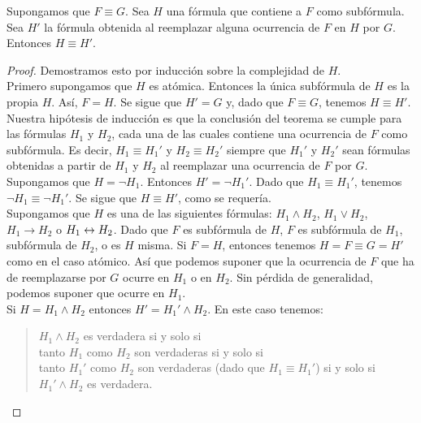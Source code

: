 \documentclass[12pt,a4paper]{book}
\begin{document}
    \begin{teorema}\label{thm:sustitucion}
        Supongamos que $F\equiv G$. Sea $H$ una fórmula que contiene a $F$ como subfórmula. Sea $H'$ la fórmula obtenida al
        reemplazar alguna ocurrencia de $F$ en $H$ por $G$. Entonces $H\equiv H'$.
    \end{teorema}
    \begin{proof}
        Demostramos esto por inducción sobre la complejidad de $H$.\\
        Primero supongamos que $H$ es atómica. Entonces la única subfórmula de $H$ es la propia $H$. Así, $F=H$. Se sigue que
        $H'=G$ y, dado que $F\equiv G$, tenemos $H\equiv H'$.\\
        Nuestra hipótesis de inducción es que la conclusión del teorema se cumple para las fórmulas $H_{1}$ y $H_{2}$, cada una
        de las cuales contiene una ocurrencia de $F$ como subfórmula. Es decir, $H_{1}\equiv H_{1}'$ y $H_{2}\equiv H_{2}'$
        siempre que $H_{1}'$ y $H_{2}'$ sean fórmulas obtenidas a partir de $H_{1}$ y $H_{2}$ al reemplazar una ocurrencia de
        $F$ por $G$.\\
        Supongamos que $H=\neg H_{1}$. Entonces $H'=\neg H_{1}'$. Dado que $H_{1}\equiv H_{1}'$, tenemos $\neg H_{1}\equiv\neg H_{1}'$.
        Se sigue que $H\equiv H'$, como se requería.\\
        Supongamos que $H$ es una de las siguientes fórmulas: $H_{1}\wedge H_{2}$, $H_{1}\vee H_{2}$, $H_{1}\rightarrow H_{2}$ o
        $H_{1}\leftrightarrow H_{2}$. Dado que $F$ es subfórmula de $H$, $F$ es subfórmula de $H_{1}$, subfórmula de $H_{2}$, o es $H$
        misma. Si $F=H$, entonces tenemos $H=F\equiv G=H'$ como en el caso atómico. Así que podemos suponer que la ocurrencia
        de $F$ que ha de reemplazarse por $G$ ocurre en $H_{1}$ o en $H_{2}$. Sin pérdida de generalidad, podemos suponer que
        ocurre en $H_{1}$.\\
        Si $H=H_{1}\wedge H_{2}$ entonces $H'=H_{1}'\wedge H_{2}$. En este caso tenemos:
        \begin{quote}
            $H_{1}\wedge H_{2}$ es verdadera si y solo si\\
            tanto $H_{1}$ como $H_{2}$ son verdaderas si y solo si\\
            tanto $H_{1}'$ como $H_{2}$ son verdaderas (dado que $H_{1}\equiv H_{1}'$) si y solo si\\
            $H_{1}'\wedge H_{2}$ es verdadera.
        \end{quote}

\end{proof}
\end{document}
